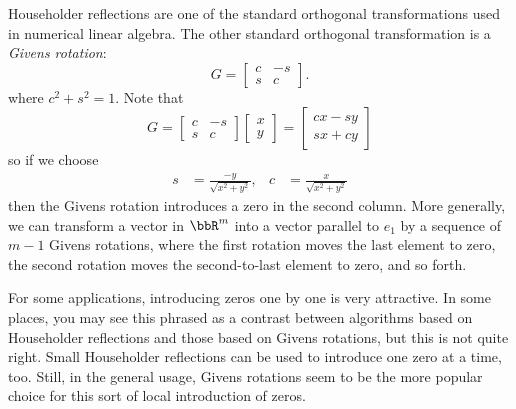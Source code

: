 \documentclass[12pt, leqno]{article} %
\begin{document}
Householder reflections are one of the standard orthogonal
transformations used in numerical linear algebra.  The other standard
orthogonal transformation is a {\em Givens rotation}:
\[
  G = \begin{bmatrix}
    c & -s \\
    s & c
  \end{bmatrix}.
\]
where $c^2 + s^2 = 1$.  Note that
\[
  G = \begin{bmatrix}
    c & -s \\
    s & c
  \end{bmatrix}
  \begin{bmatrix}
    x \\ y
  \end{bmatrix} =
  \begin{bmatrix}
    cx - sy \\
    sx + cy
  \end{bmatrix}
\]
so if we choose
\begin{align*}
  s &= \frac{-y}{\sqrt{x^2 + y^2}}, &
  c &= \frac{x}{\sqrt{x^2+y^2}}
\end{align*}
then the Givens rotation introduces a zero in the second column.
More generally, we can transform a vector in $\bbR^m$ into a vector
parallel to $e_1$ by a sequence of $m-1$ Givens rotations, where
the first rotation moves the last element to zero, the second rotation
moves the second-to-last element to zero, and so forth.

For some applications, introducing zeros one by one is very
attractive.  In some places, you may see this phrased as a contrast
between algorithms based on Householder reflections and those based on
Givens rotations, but this is not quite right.  Small Householder
reflections can be used to introduce one zero at a time, too.
Still, in the general usage, Givens rotations seem to be the more
popular choice for this sort of local introduction of zeros.
\end{document}

